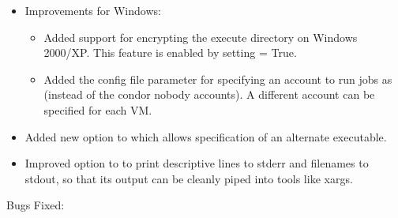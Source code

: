 \begin{itemize}
\item Improvements for Windows:
  \begin{itemize}
  \item Added support for encrypting the execute directory
    on Windows 2000/XP. This feature is enabled by setting
     = True.
  \item Added the  config file parameter for specifying
    an account to run jobs as (instead of the condor nobody accounts). A
    different account can be specified for each VM.
  \end{itemize}

\item Added new option  to  which allows 
specification of an alternate  executable. 

\item Improved  option to  to print
      descriptive lines to stderr and filenames to stdout, so that its
      output can be cleanly piped into tools like xargs.

\end{itemize}

\noindent Bugs Fixed:

